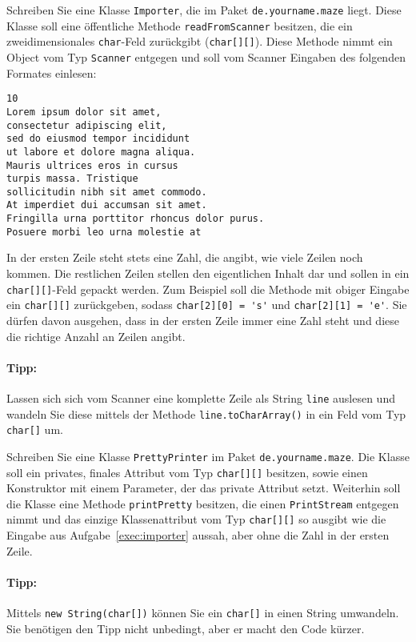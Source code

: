 \documentclass{exam}
\begin{document}
\begin{questions}
\label{exec:importer}
Schreiben Sie eine Klasse \verb|Importer|, die im Paket \verb|de.yourname.maze| liegt. Diese Klasse soll eine öffentliche Methode \verb|readFromScanner| besitzen, die ein zweidimensionales \verb|char|-Feld zurückgibt (\verb|char[][]|). Diese Methode nimmt ein Object vom Typ \verb|Scanner| entgegen und soll vom Scanner Eingaben des folgenden Formates einlesen:

\begin{lstlisting}
10
Lorem ipsum dolor sit amet,
consectetur adipiscing elit,
sed do eiusmod tempor incididunt
ut labore et dolore magna aliqua.
Mauris ultrices eros in cursus
turpis massa. Tristique
sollicitudin nibh sit amet commodo.
At imperdiet dui accumsan sit amet.
Fringilla urna porttitor rhoncus dolor purus.
Posuere morbi leo urna molestie at
\end{lstlisting}

In der ersten Zeile steht stets eine Zahl, die angibt, wie viele Zeilen noch kommen. Die restlichen Zeilen stellen den eigentlichen Inhalt dar und sollen in ein \verb|char[][]|-Feld gepackt werden. Zum Beispiel soll die Methode mit obiger Eingabe ein \verb|char[][]| zurückgeben, sodass \verb|char[2][0] = 's'| und \verb|char[2][1] = 'e'|. Sie dürfen davon ausgehen, dass in der ersten Zeile immer eine Zahl steht und diese die richtige Anzahl an Zeilen angibt.

\paragraph{Tipp:} Lassen sich sich vom Scanner eine komplette Zeile als String \verb|line| auslesen und wandeln Sie diese mittels der Methode \verb|line.toCharArray()| in ein Feld vom Typ \verb|char[]| um.


Schreiben Sie eine Klasse \verb|PrettyPrinter| im Paket \verb|de.yourname.maze|. Die Klasse soll ein privates, finales Attribut vom Typ \verb|char[][]| besitzen, sowie einen Konstruktor mit einem Parameter, der das private Attribut setzt. Weiterhin soll die Klasse eine Methode \verb|printPretty| besitzen, die einen \verb|PrintStream| entgegen nimmt und das einzige Klassenattribut vom Typ \verb|char[][]| so ausgibt wie die Eingabe aus Aufgabe~\ref{exec:importer} aussah, aber ohne die Zahl in der ersten Zeile.

\paragraph{Tipp:} Mittels \verb|new String(char[])| können Sie ein \verb|char[]| in einen String umwandeln. Sie benötigen den Tipp nicht unbedingt, aber er macht den Code kürzer.


\end{questions}
\end{document}
